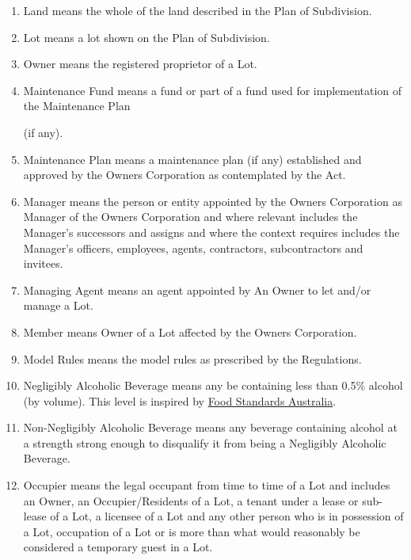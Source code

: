 \documentclass{article}
\begin{document}
\begin{enumerate}[label=\arabic*.]
\begin{enumerate}[label=\arabic{enumi}.\arabic*.]
\begin{enumerate}[label=\arabic{enumi}.\arabic*.]
\begin{enumerate}[label=(\arabic*)]
\item  Land means the whole of the land described in the Plan of Subdivision.

\item  Lot means a lot shown on the Plan of Subdivision.

\item  Owner means the registered proprietor of a Lot.

\item  Maintenance Fund means a fund or part of a fund used for implementation of the Maintenance Plan

(if any).

\item  Maintenance Plan means a maintenance plan (if any) established and approved by the Owners Corporation as contemplated by the Act.

\item  Manager means the person or entity appointed by the Owners Corporation as Manager of the Owners Corporation and where relevant includes the Manager’s successors and assigns and where the context requires includes the Manager’s officers, employees, agents, contractors, subcontractors and invitees.

\item  Managing Agent means an agent appointed by An Owner to let and/or manage a Lot.
\newpage



\item  Member means Owner of a Lot affected by the Owners Corporation.

\item  Model Rules means the model rules as prescribed by the Regulations.

\item Negligibly Alcoholic Beverage means any be containing less than 0.5\% alcohol (by volume). This level is inspired by \href{https://www.foodstandards.gov.au/consumer/labelling/Labelling-of-alcoholic-beverages}{Food Standards Australia}.
\item Non-Negligibly Alcoholic Beverage means any beverage containing alcohol at a strength strong enough to disqualify it from being a Negligibly Alcoholic Beverage.
\item  Occupier means the legal occupant from time to time of a Lot and includes an Owner, an Occupier/Residents of a Lot, a tenant under a lease or sub-lease of a Lot, a licensee of a Lot and any other person who is in possession of a Lot, occupation of a Lot or is more than what would reasonably be considered a temporary guest in a Lot.


\end{enumerate}
\end{enumerate}
\end{enumerate}
\end{enumerate}
\end{document}

